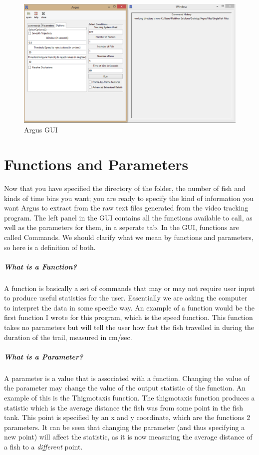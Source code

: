\documentclass[12pt,titlepage]{report}
\begin{document}
\begin{figure}[ht!]
\centering
\includegraphics[width=150mm]{image11.png}
\caption{Argus GUI}
\label{overflow}
\end{figure}

\chapter{Functions and Parameters}
Now that you have specified the directory of the folder, the number of fish and kinds of time bins you want; you are ready to specify the kind of information you want Argus to extract from the raw text files generated from the video tracking program. The left panel in the GUI contains all the functions available to call, as well as the parameters for them, in a seperate tab. In the GUI, functions are called Commands. We should clarify what we mean by functions and parameters, so here is a definition of both.
\paragraph{What is a Function?}
A function is basically a set of commands that may or may not require user input to produce useful statistics for the user. Essentially we are asking the computer to interpret the data in some specific way. An example of a function would be the first function I wrote for this program, which is the speed function. This function takes no parameters but will tell the user how fast the fish travelled in during the duration of the trail, measured in cm/sec.
\paragraph{What is a Parameter?}
A parameter is a value that is associated with a function. Changing the value of the parameter may change the value of the output statistic of the function. An example of this is the Thigmotaxis function. The thigmotaxis function produces a statistic which is the average distance the fish was from some point in the fish tank. This point is specified by an x and y coordinate, which are the functions 2 parameters. It can be seen that changing the parameter (and thus specifying a new point) will affect the statistic, as it is now measuring the average distance of a fish to a \emph{different} point. 
\end{document}
